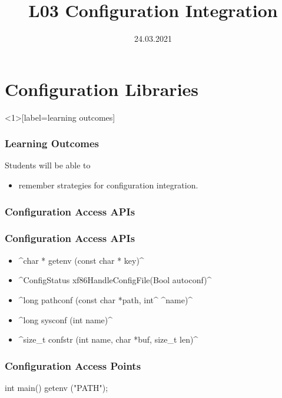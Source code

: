 


\title{L03 Configuration Integration}
\date{24.03.2021}



\section{Configuration Libraries}


\begin{frame}<1>[label=learning outcomes]
	\frametitle{Learning Outcomes}
	Students will be able to
	\begin{itemize}
	\item remember strategies for configuration integration.
	\end{itemize}
\end{frame}

\begin{frame}
	\frametitle{Configuration Access APIs}

	\Large

\end{frame}

\begin{frame}[fragile]
	\frametitle{Configuration Access APIs}

	\begin{itemize}[<+-| alert@+>]
	\item ^char * getenv (const char * key)^
	\item ^ConfigStatus xf86HandleConfigFile(Bool autoconf)^
	\item ^long pathconf (const char *path, int^ ^name)^
	\item ^long sysconf (int name)^
	\item ^size_t confstr (int name, char *buf, size_t len)^
	\end{itemize}
\end{frame}

\begin{frame}[fragile]
	\frametitle{Configuration Access Points}

	\begin{code}[language=Cpp,gobble=4,showspaces=no]
	int main()
	{
		getenv ("PATH");
	}
	\end{code}
\end{frame}

